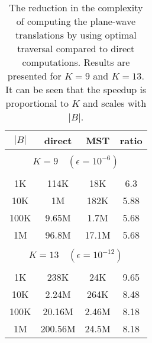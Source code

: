 \begin{table}
\caption{The reduction in the complexity of computing the plane-wave translations by using optimal traversal compared to direct computations. Results are presented for $K=9$ and $K=13$. It can be seen that the speedup is proportional to $K$ and scales with $|B|$.}
\centering
\begin{tabular}{cccc} \hline
        $|B|$  &  direct & MST & ratio \\ \hline       
        \multicolumn{4}{c}{}  \\
        \multicolumn{4}{c}{ {\small $K =  9 \quad (\epsilon = 10^{-6})$}}  \\
        \multicolumn{4}{c}{}  \\
         1K & 114K & 18K & 6.3 \\  
        10K & 1M & 182K & 5.88 \\  
       100K & 9.65M & 1.7M & 5.68 \\  
       1M & 96.8M & 17.1M & 5.68 \\  
       \multicolumn{4}{c}{}  \\
       \multicolumn{4}{c}{ {\small $K =  13 \quad (\epsilon = 10^{-12})$}}  \\
       \multicolumn{4}{c}{}  \\
             1K & 238K & 24K & 9.65 \\  
        10K & 2.24M & 264K & 8.48 \\  
        100K & 20.16M & 2.46M & 8.18 \\  
       1M &   200.56M & 24.5M & 8.18 \\   
\hline
\end{tabular} \label{tab:ratio}
\end{table}

